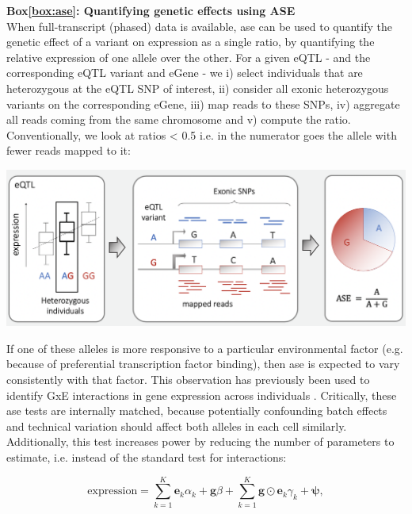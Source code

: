
\newpage

\begin{Comment}
\hspace{-2.5mm}\textbf{Box\ref{box:ase}: Quantifying genetic effects using ASE}\label{box:ase}\\
\small
When full-transcript (phased) data is available, \gls{ase} can be used to quantify the genetic effect of a variant on expression as a single ratio, by quantifying the relative expression of one allele over the other.
For a given eQTL - and the corresponding eQTL variant and eGene -  we i) select individuals that are heterozygous at the eQTL SNP of interest, ii) consider all exonic heterozygous variants on the corresponding eGene, iii) map reads to these SNPs, iv) aggregate all reads coming from the same chromosome and v) compute the ratio. 
Conventionally, we look at ratios < 0.5 i.e. in the numerator goes the allele with fewer reads mapped to it:

\vspace{5mm}

\includegraphics[width=15cm]{Chapter4/Fig/ASE.png}

If one of these alleles is more responsive to a particular environmental factor (e.g. because of preferential transcription factor binding), then \gls{ase} is expected to vary consistently with that factor. 
This observation has previously been used to identify GxE interactions in gene expression across individuals \cite{knowles2017allele}. 
Critically, these \gls{ase} tests are internally matched, because potentially confounding batch effects and technical variation should affect both alleles in each cell similarly.
Additionally, this test increases power by reducing the number of parameters to estimate, i.e. instead of the standard test for interactions:  

\begin{equation*}
    \mathrm{expression} = \sum_{k=1}^{K} \mathbf{e}_k\alpha_k + \mathbf{g}\beta +
    \sum_{k=1}^{K} \mathbf{g} \odot \mathbf{e}_k\gamma_k + \boldsymbol{\psi},
\end{equation*}


\end{Comment}
